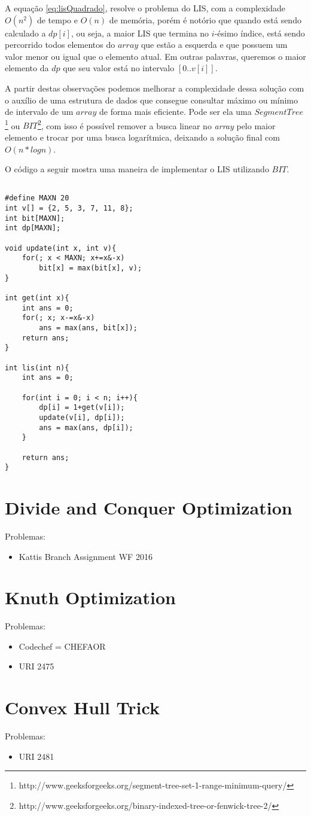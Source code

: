 A equação \ref{eq:lisQuadrado}, resolve o problema do LIS, com a complexidade $O(n^2)$ de tempo e $O(n)$ de memória, porém é notório que quando está sendo calculado a $dp[i]$, ou seja, a maior LIS que termina no $i$-ésimo índice, está sendo percorrido todos elementos do $array$ que estão a esquerda e que possuem um valor menor ou igual que o elemento atual. Em outras palavras, queremos o maior elemento da $dp$ que seu valor está no intervalo $[0..v[i]]$.

A partir destas observações podemos melhorar a complexidade dessa solução com o auxílio de uma estrutura de dados que consegue consultar máximo ou mínimo de intervalo de um $array$ de forma mais eficiente. Pode ser ela uma $Segment Tree$\footnote{http://www.geeksforgeeks.org/segment-tree-set-1-range-minimum-query/} ou $BIT$\footnote{http://www.geeksforgeeks.org/binary-indexed-tree-or-fenwick-tree-2/}, com isso é possível remover a busca linear no \textit{array} pelo maior elemento e trocar por uma busca logarítmica, deixando a solução final com $O(n*logn)$.

O código a seguir mostra uma maneira de implementar o LIS utilizando $BIT$.
\begin{lstlisting}[caption={Implementação LIS},label={lst:lis}]

#define MAXN 20
int v[] = {2, 5, 3, 7, 11, 8};
int bit[MAXN];
int dp[MAXN];

void update(int x, int v){
	for(; x < MAXN; x+=x&-x)
		bit[x] = max(bit[x], v);
}

int get(int x){
	int ans = 0;
	for(; x; x-=x&-x)
		ans = max(ans, bit[x]);
	return ans;
}

int lis(int n){
	int ans = 0;
	
	for(int i = 0; i < n; i++){
		dp[i] = 1+get(v[i]);
		update(v[i], dp[i]);
		ans = max(ans, dp[i]);
	}
	
	return ans;
}
\end{lstlisting}

\section{Divide and Conquer Optimization}
Problemas:

\begin{itemize}
	\item Kattis Branch Assignment WF 2016
\end{itemize}

\section{Knuth Optimization}
Problemas:
\begin{itemize}
	\item Codechef = CHEFAOR
	\item URI 2475
\end{itemize}

\section{Convex Hull Trick}
Problemas:
\begin{itemize}
	\item URI 2481
\end{itemize}

